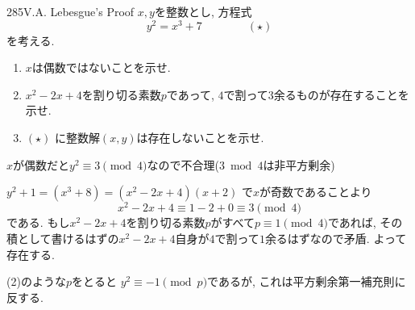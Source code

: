 \begin{prob}{285}{}{V.A. Lebesgue's Proof}
$x,y$を整数とし, 方程式
$$
y^2 = x^3 + 7\qquad\qquad (\star)
$$
を考える. 
\begin{enumerate}
\item $x$は偶数ではないことを示せ.
\item $x^2 - 2x + 4$を割り切る素数$p$であって, $4$で割って$3$余るものが存在することを示せ. 
\item $(\star)$ に整数解$(x,y)$は存在しないことを示せ. 
\end{enumerate}
\end{prob}

$x$が偶数だと$y^2\equiv 3\pmod{4}$なので不合理($3\bmod{4}$は非平方剰余)

$y^2 + 1 = (x^3 + 8) = (x^2 - 2x + 4)(x+2)$ で$x$が奇数であることより
$$
x^2 - 2x + 4 \equiv 1 - 2 + 0 \equiv 3\pmod{4}
$$
である. もし$x^2 - 2x + 4$を割り切る素数$p$がすべて$p\equiv 1\pmod{4}$であれば, その積として書けるはずの$x^2 - 2x + 4$自身が$4$で割って$1$余るはずなので矛盾. よって存在する. 

(2)のような$p$をとると $y^2 \equiv -1\pmod{p}$であるが, これは平方剰余第一補充則に反する. 
